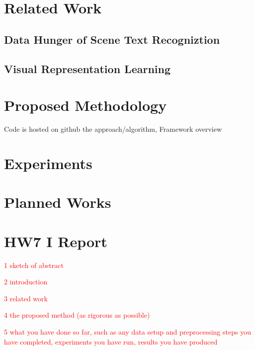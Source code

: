 \documentclass[10pt,twocolumn,letterpaper]{article}
\begin{document}
\section{Related Work}
\label{sec:relwo}
\subsection{Data Hunger of Scene Text Recogniztion}
\subsection{Visual Representation Learning}

\section{Proposed Methodology}
Code is hosted on github \cite{Johnston2022ComputerDiagnosis}
the approach/algorithm, 
Framework overview
\label{sec:meth}

\section{Experiments}
\label{sec:exp}

\section{Planned Works}
\label{sec:exp}





\clearpage


\section{HW7 I Report}
\label{sec:HW7}

\textcolor{red}{1 sketch of abstract}

\textcolor{red}{2 introduction}


\textcolor{red}{3 related work}

\textcolor{red}{4 the proposed method (as rigorous as possible)}

\textcolor{red}{5 what you have done so far, such as any data setup and preprocessing steps you have completed, experiments you have run, results you have produced}
\end{document}
